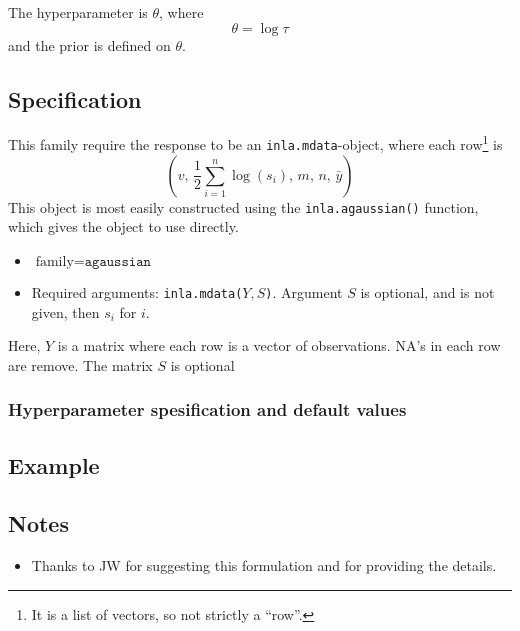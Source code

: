 \documentclass[a4paper,11pt]{article}
\begin{document}
The hyperparameter is $\theta$, where
\begin{displaymath}
    \theta = \log \tau
\end{displaymath}
and the prior is defined on $\theta$.

\subsection*{Specification}

This family require the response to be an \texttt{inla.mdata}-object,
where each row\footnote{It is a list of vectors, so not strictly a
    ``row''.} is
\begin{displaymath}
    (v, \,
    \frac{1}{2}\sum_{i=1}^{n} \log(s_i), \,
    m, \,
    n, \,
    \bar{y})
\end{displaymath}
This object is most easily constructed using the
\texttt{inla.agaussian()} function, which gives the object to use
directly.

\begin{itemize}
\item $\text{family}=\texttt{agaussian}$
\item Required arguments: \texttt{inla.mdata(}$Y,S$\texttt{)}.
    Argument $S$ is optional, and is not given, then $s_i$ for $i$.
\end{itemize}
Here, $Y$ is a matrix where each row is a vector of observations. NA's
in each row are remove. The matrix $S$ is optional

\subsubsection*{Hyperparameter spesification and default values}


\subsection*{Example}



\subsection*{Notes}

\begin{itemize}
\item Thanks to JW for suggesting this formulation and for providing
    the details.
\end{itemize}
\end{document}
